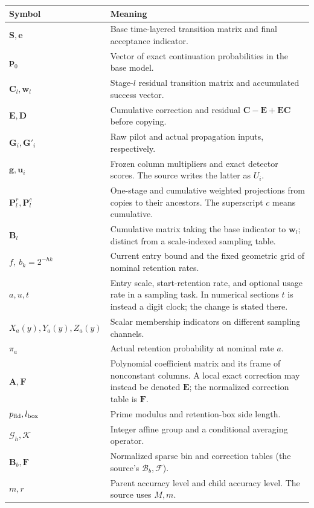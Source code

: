 \documentclass[11pt]{article}
\numberwithin{equation}{section}
\theoremstyle{definition}
\theoremstyle{remark}
\begin{document}
\begin{longtable}{@{}p{}p{}@{}}
\toprule
Symbol & Meaning\\ \midrule\endhead
$\mathbf S,\mathbf e$ & Base time-layered transition matrix and final acceptance indicator.\\
$\mathbf p_0$ & Vector of exact continuation probabilities in the base model.\\
$\mathbf C_l,\mathbf w_l$ & Stage-$l$ residual transition matrix and accumulated success vector.\\
$\mathbf E,\mathbf D$ & Cumulative correction and residual $\mathbf C-\mathbf E+\mathbf E\mathbf C$ before copying.\\
$\mathbf G_i,\mathbf G'_i$ & Raw pilot and actual propagation inputs, respectively.\\
$\mathbf g,\mathbf u_i$ & Frozen column multipliers and exact detector scores. The source writes the latter as $U_i$.\\
$\mathbf P_l^r,\mathbf P_l^c$ & One-stage and cumulative weighted projections from copies to their ancestors. The superscript $c$ means cumulative.\\
$\mathbf B_l$ & Cumulative matrix taking the base indicator to $\mathbf w_l$; distinct from a scale-indexed sampling table.\\
$f,\ b_k=2^{-hk}$ & Current entry bound and the fixed geometric grid of nominal retention rates.\\
$a,u,t$ & Entry scale, start-retention rate, and optional usage rate in a sampling task. In numerical sections $t$ is instead a digit clock; the change is stated there.\\
$X_a(y),Y_a(y),Z_a(y)$ & Scalar membership indicators on different sampling channels.\\
$\pi_a$ & Actual retention probability at nominal rate $a$.\\
$\mathbf A,\mathbf F$ & Polynomial coefficient matrix and its frame of nonconstant columns. A local exact correction may instead be denoted $\mathbf E$; the normalized correction table is $\mathbf F$.\\
$p_{\rm fld},l_{\rm box}$ & Prime modulus and retention-box side length.\\
$\mathcal G_h,\mathcal K$ & Integer affine group and a conditional averaging operator.\\
$\mathbf B_b,\mathbf F$ & Normalized sparse bin and correction tables (the source's $\mathcal B_b,\mathcal F$).\\
$m,r$ & Parent accuracy level and child accuracy level. The source uses $M,m$.\\

\end{longtable}
\end{document}
